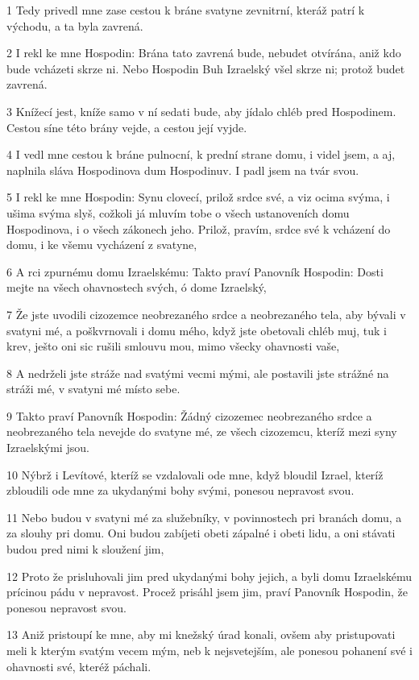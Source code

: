 \par 1 Tedy privedl mne zase cestou k bráne svatyne zevnitrní, kteráž patrí k východu, a ta byla zavrená.
\par 2 I rekl ke mne Hospodin: Brána tato zavrená bude, nebudet otvírána, aniž kdo bude vcházeti skrze ni. Nebo Hospodin Buh Izraelský všel skrze ni; protož budet zavrená.
\par 3 Knížecí jest, kníže samo v ní sedati bude, aby jídalo chléb pred Hospodinem. Cestou síne této brány vejde, a cestou její vyjde.
\par 4 I vedl mne cestou k bráne pulnocní, k prední strane domu, i videl jsem, a aj, naplnila sláva Hospodinova dum Hospodinuv. I padl jsem na tvár svou.
\par 5 I rekl ke mne Hospodin: Synu clovecí, prilož srdce své, a viz ocima svýma, i ušima svýma slyš, cožkoli já mluvím tobe o všech ustanoveních domu Hospodinova, i o všech zákonech jeho. Prilož, pravím, srdce své k vcházení do domu, i ke všemu vycházení z svatyne,
\par 6 A rci zpurnému domu Izraelskému: Takto praví Panovník Hospodin: Dosti mejte na všech ohavnostech svých, ó dome Izraelský,
\par 7 Že jste uvodili cizozemce neobrezaného srdce a neobrezaného tela, aby bývali v svatyni mé, a poškvrnovali i domu mého, když jste obetovali chléb muj, tuk i krev, ješto oni sic rušili smlouvu mou, mimo všecky ohavnosti vaše,
\par 8 A nedrželi jste stráže nad svatými vecmi mými, ale postavili jste strážné na stráži mé, v svatyni mé místo sebe.
\par 9 Takto praví Panovník Hospodin: Žádný cizozemec neobrezaného srdce a neobrezaného tela nevejde do svatyne mé, ze všech cizozemcu, kteríž mezi syny Izraelskými jsou.
\par 10 Nýbrž i Levítové, kteríž se vzdalovali ode mne, když bloudil Izrael, kteríž zbloudili ode mne za ukydanými bohy svými, ponesou nepravost svou.
\par 11 Nebo budou v svatyni mé za služebníky, v povinnostech pri branách domu, a za slouhy pri domu. Oni budou zabíjeti obeti zápalné i obeti lidu, a oni stávati budou pred nimi k sloužení jim,
\par 12 Proto že prisluhovali jim pred ukydanými bohy jejich, a byli domu Izraelskému prícinou pádu v nepravost. Procež prisáhl jsem jim, praví Panovník Hospodin, že ponesou nepravost svou.
\par 13 Aniž pristoupí ke mne, aby mi knežský úrad konali, ovšem aby pristupovati meli k kterým svatým vecem mým, neb k nejsvetejším, ale ponesou pohanení své i ohavnosti své, kteréž páchali.
